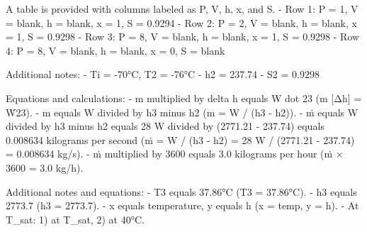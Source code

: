 A table is provided with columns labeled as P, V, h, x, and S.  
- Row 1: P = 1, V = blank, h = blank, x = 1, S = 0.9294  
- Row 2: P = 2, V = blank, h = blank, x = 1, S = 0.9298  
- Row 3: P = 8, V = blank, h = blank, x = 1, S = 0.9298  
- Row 4: P = 8, V = blank, h = blank, x = 0, S = blank  

Additional notes:  
- Ti = -70°C, T2 = -76°C  
- h2 = 237.74  
- S2 = 0.9298  

Equations and calculations:  
- m multiplied by delta h equals W dot 23 (m [Δh] = Ẇ23).  
- m equals W divided by h3 minus h2 (m = W / (h3 - h2)).  
- ṁ equals W divided by h3 minus h2 equals 28 W divided by (2771.21 - 237.74) equals 0.008634 kilograms per second (ṁ = W / (h3 - h2) = 28 W / (2771.21 - 237.74) = 0.008634 kg/s).  
- ṁ multiplied by 3600 equals 3.0 kilograms per hour (ṁ × 3600 = 3.0 kg/h).  

Additional notes and equations:  
- T3 equals 37.86°C (T3 = 37.86°C).  
- h3 equals 2773.7 (h3 = 2773.7).  
- x equals temperature, y equals h (x = temp, y = h).  
- At T_sat: 1) at T_sat, 2) at 40°C.